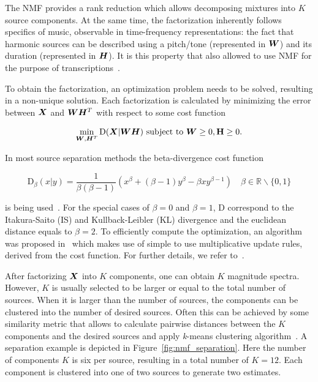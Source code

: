 The \acs{NMF} provides a rank reduction which allows decomposing mixtures into \(K\) source components.
At the same time, the factorization inherently follows specifics of music, observable in time-frequency representations: the fact that harmonic sources can be described using a pitch/tone (represented in \({\bm{W}}\)) and its duration (represented in \({\bm{H}}\)).
It is this property that also allowed to use \acs{NMF} for the purpose of transcriptions~\cite{smaragdis03}.
\par
To obtain the factorization, an optimization problem needs to be solved, resulting in a non-unique solution.
Each factorization is calculated by minimizing the error between \({\bm{X}}\) and \({\bm{W}} {\bm{H}}^{T}\) with respect to some cost function

\begin{equation}
  \min_{{\bm{W}},{\bm{H}}^{T}} \mathrm{D}({\bm{X}} | {\bm{W}} {\bm{H}}) \text { subject to } {\bm{W}} \geq 0 , \mathbf {{\bm{H}}} \geq 0.
\end{equation}

In most source separation methods the beta-divergence cost function

\begin{equation}
  \mathrm{D}_{\beta} (x | y) = \frac { 1 } { \beta ( \beta - 1 ) } \left( x ^ { \beta } + ( \beta - 1 ) y ^ { \beta } - \beta x y ^ { \beta - 1 } \right) \quad \beta \in \mathbb { R } \backslash \{ 0, 1 \}
\end{equation}

is being used~\cite{fitzgerald08a}. 
For the special cases of \(\beta = 0\) and \(\beta = 1\), \(\mathrm{D}\) correspond to the Itakura-Saito (IS) and Kullback-Leibler (KL) divergence and the euclidean distance equals to \(\beta = 2\). 
To efficiently compute the optimization, an algorithm was proposed in~\cite{lee01} which makes use of simple to use multiplicative update rules, derived from the cost function. 
For further details, we refer to~\cite{cichoki09}.
\par
After factorizing \({\bm{X}}\) into \(K\) components, one can obtain \(K\) magnitude spectra.
However, \(K\) is usually selected to be larger or equal to the total number of sources.
When it is larger than the number of sources, the components can be clustered into the number of desired sources.
Often this can be achieved by some similarity metric that allows to calculate pairwise distances between the \(K\) components and the desired sources and apply \textit{k}-means clustering algorithm~\cite{spiertz09}.
A separation example is depicted in Figure~\ref{fig:nmf_separation}. 
Here the number of components \(K\) is six per source, resulting in a total number of \(K=12\). 
Each component is clustered into one of two sources to generate two estimates.


